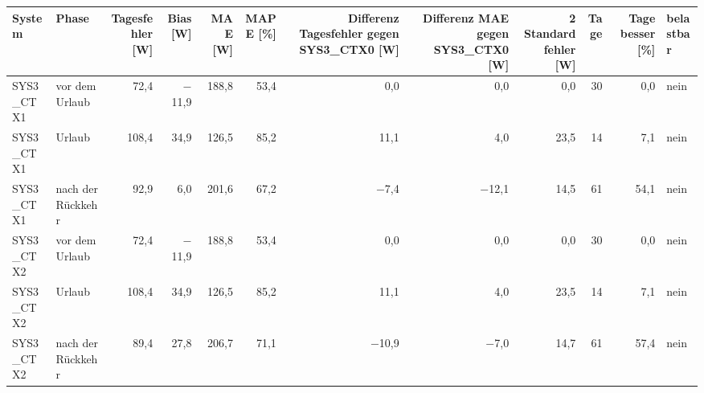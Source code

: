 \begin{tabular}{llrrrrrrrrrl}
\toprule
System & Phase & Tagesfehler [W] & Bias [W] & MAE [W] & MAPE [\%] & Differenz Tagesfehler gegen SYS3\_CTX0 [W] & Differenz MAE gegen SYS3\_CTX0 [W] & 2 Standardfehler [W] & Tage & Tage besser [\%] & belastbar \\
\midrule
SYS3\_CTX1 & vor dem Urlaub & 72,4 & $-$11,9 & 188,8 & 53,4 & 0,0 & 0,0 & 0,0 & 30 & 0,0 & nein \\
SYS3\_CTX1 & Urlaub & 108,4 & 34,9 & 126,5 & 85,2 & 11,1 & 4,0 & 23,5 & 14 & 7,1 & nein \\
SYS3\_CTX1 & nach der Rückkehr & 92,9 & 6,0 & 201,6 & 67,2 & $-$7,4 & $-$12,1 & 14,5 & 61 & 54,1 & nein \\
SYS3\_CTX2 & vor dem Urlaub & 72,4 & $-$11,9 & 188,8 & 53,4 & 0,0 & 0,0 & 0,0 & 30 & 0,0 & nein \\
SYS3\_CTX2 & Urlaub & 108,4 & 34,9 & 126,5 & 85,2 & 11,1 & 4,0 & 23,5 & 14 & 7,1 & nein \\
SYS3\_CTX2 & nach der Rückkehr & 89,4 & 27,8 & 206,7 & 71,1 & $-$10,9 & $-$7,0 & 14,7 & 61 & 57,4 & nein \\
\bottomrule
\end{tabular}
